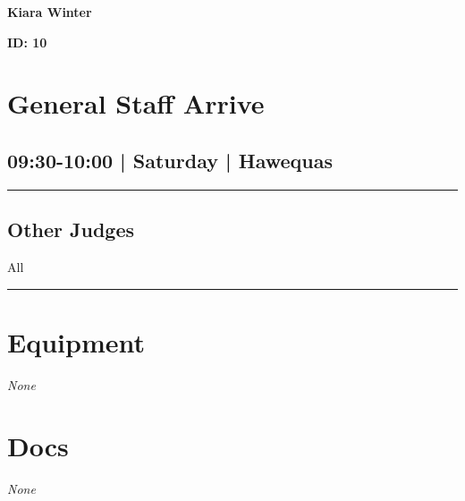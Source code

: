 \documentclass[10pt, A5]{article}
\newcommand{\newtitle}[1]{\begin{center}{\Huge\bfseries #1 }\\ \vspace{5mm}\end{center}}
\newcommand{\newsubtitle}[1]{\begin{center}{\color{grey}\Large\bfseries #1 }\\ \vspace{5mm}\end{center}}
\begin{document}
		\newtitle{Kiara Winter}
	\newsubtitle{ID: 10}


        \begin{framed}
        \begin{minipage}{\textwidth}

        \setcounter{section}{2}
        \section{General Staff Arrive}
        \subsection*{09:30-10:00 | Saturday | Hawequas}

        \vspace{0.25cm}
        \hrule
        \vspace{0.25cm}


        \subsection*{Other Judges}
                    All

            \vspace{0.25cm}
        \hrule
        \vspace{0.25cm}

        \begin{multicols}{2}

		\section*{\faWrench \: Equipment}

				\textit{None}
		
		\vfill\null
		\columnbreak

			\section*{\faFile \: Docs}
		 	\textit{None}
	

		\vfill\null

		\end{multicols}
\end{minipage}
\end{framed}
\end{document}

